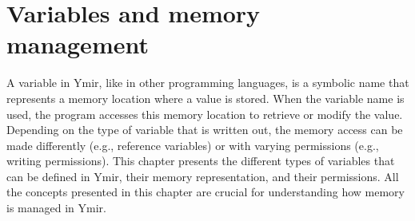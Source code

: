 \pagecolor{gray!10!white}

\chapter{Variables and memory management}
\label{chap:variables}

A variable in Ymir, like in other programming languages, is a symbolic name that
represents a memory location where a value is stored. When the variable name is
used, the program accesses this memory location to retrieve or modify the value.
Depending on the type of variable that is written out, the memory access can be
made differently (e.g., reference variables) or with varying permissions (e.g.,
writing permissions). This chapter presents the different types of variables
that can be defined in Ymir, their memory representation, and their permissions.
All the concepts presented in this chapter are crucial for understanding how
memory is managed in Ymir.

\begin{multicols*}{2}
  \minitoc%
  
\end{multicols*}

\nopagecolor{}
